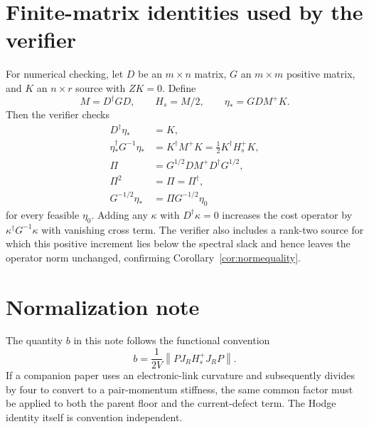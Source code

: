 \documentclass[11pt]{article}
\theoremstyle{definition}
\theoremstyle{remark}
\newcommand{\norm}[1]{\left\lVert #1\right\rVert}
\begin{document}
\appendix
\section{Finite-matrix identities used by the verifier}
\label{app:verifier}

For numerical checking, let $D$ be an $m\times n$ matrix, $G$ an $m\times m$ positive matrix, and $K$ an $n\times r$ source with $ZK=0$.  Define
\[
 M=D^\dagger GD,
 \qquad
 H_s=M/2,
 \qquad
 \eta_*=GDM^+K.
\]
Then the verifier checks
\begin{align}
 D^\dagger\eta_*&=K,\\
 \eta_*^\dagger G^{-1}\eta_*&=K^\dagger M^+K
 =\frac12K^\dagger H_s^+K,\\
 \Pi&=G^{1/2}DM^+D^\dagger G^{1/2},\\
 \Pi^2&=\Pi=\Pi^\dagger,\\
 G^{-1/2}\eta_*&=\Pi G^{-1/2}\eta_0
\end{align}
for every feasible $\eta_0$.  Adding any $\kappa$ with $D^\dagger\kappa=0$ increases the cost operator by $\kappa^\dagger G^{-1}\kappa$ with vanishing cross term.  The verifier also includes a rank-two source for which this positive increment lies below the spectral slack and hence leaves the operator norm unchanged, confirming Corollary~\ref{cor:normequality}.

\section{Normalization note}
\label{app:normalization}

The quantity $b$ in this note follows the functional convention
\[
 b=\frac1{2V}\norm{PJ_RH_s^+J_RP}.
\]
If a companion paper uses an electronic-link curvature and subsequently divides by four to convert to a pair-momentum stiffness, the same common factor must be applied to both the parent floor and the current-defect term.  The Hodge identity itself is convention independent.
\end{document}
